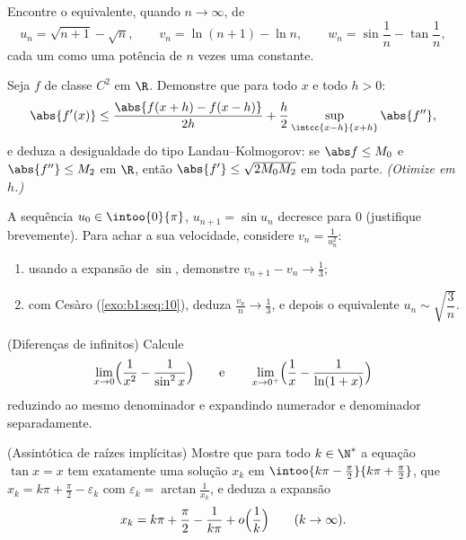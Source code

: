 \begin{exercise}[$\star\star$]\label{exo:b1:taylor:8}
Encontre o equivalente, quando $n \to \infty$, de
\[
u_n = \sqrt{n+1} - \sqrt n, \qquad
v_n = \ln(n+1) - \ln n, \qquad
w_n = \sin\frac{1}{n} - \tan\frac{1}{n},
\]
cada um como uma potência de $n$ vezes uma constante.
\end{exercise}

\begin{exercise}[$\star\star\star$]\label{exo:b1:taylor:9}
Seja $f$ de classe $C^2$ em $\R$. Demonstre que para todo $x$ e todo $h > 0$:
\[
\abs{f'(x)} \leq \frac{\abs{f(x+h) - f(x-h)}}{2h} +
\frac{h}{2}\sup_{\intcc{x-h}{x+h}}\abs{f''} ,
\]
e deduza a desigualdade do tipo Landau--Kolmogorov: se $\abs f \leq
M_0$ e $\abs{f''} \leq M_2$
em $\R$, então $\abs{f'} \leq
\sqrt{2 M_0 M_2}$ em toda parte. \emph{(Otimize em $h$.)}
\end{exercise}

\begin{exercise}[$\star\star\star$]\label{exo:b1:taylor:10}
A sequência $u_0 \in \intoo{0}{\pi}$, $u_{n+1} = \sin u_n$
decresce para $0$ (justifique brevemente). Para achar a sua
velocidade, considere $v_n
= \frac{1}{u_n^2}$:
\begin{enumerate}
  \item usando a expansão de $\sin$, demonstre $v_{n+1} - v_n \to
        \frac13$;
  \item com Cesàro (\cref{exo:b1:seq:10}), deduza $\frac{v_n}{n}
        \to \frac13$, e depois o equivalente $u_n \sim
        \sqrt{\dfrac{3}{n}}$.
\end{enumerate}
\end{exercise}

\begin{exercise}[$\star\star$]\label{exo:b1:taylor:11}
(Diferenças de infinitos) Calcule
\[
\lim_{x \to 0} \Bigl(\frac{1}{x^2} - \frac{1}{\sin^2 x}\Bigr)
\qquad\text{e}\qquad
\lim_{x \to 0^+} \Bigl(\frac 1x - \frac{1}{\ln(1 + x)}\Bigr)
\]
reduzindo ao mesmo denominador e expandindo numerador e denominador
separadamente.
\end{exercise}

\begin{exercise}[$\star\star\star$]\label{exo:b1:taylor:12}
(Assintótica de raízes implícitas) Mostre que para todo $k \in
\N^*$ a
equação $\tan x = x$ tem exatamente uma solução $x_k$ em $\intoo{k\pi - \frac\pi2}{k\pi + \frac\pi2}$, que $x_k = k\pi
+ \frac\pi2 - \varepsilon_k$ com
$\varepsilon_k =
\arctan\frac{1}{x_k}$, e deduza a expansão
\[
x_k = k\pi + \frac\pi2 - \frac{1}{k\pi} + o\Bigl(\frac
1k\Bigr) \qquad (k \to \infty).
\]
\end{exercise}

